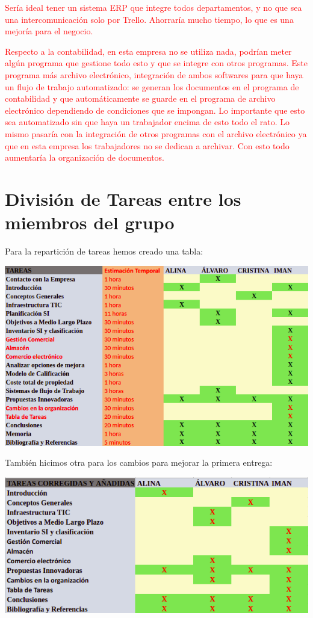 \documentclass{article}
\begin{document}
\textcolor{Red}{Sería ideal tener un sistema ERP que integre todos departamentos, y no que sea una intercomunicación solo por Trello. Ahorraría mucho tiempo, lo que es una mejoría para el negocio.}

\textcolor{Red}{Respecto a la contabilidad, en esta empresa no se utiliza nada, podrían meter algún programa que gestione todo esto y que se integre con otros programas. Este programa más archivo electrónico, integración de ambos softwares para que haya un flujo de trabajo automatizado: se generan los documentos en el programa de contabilidad y que automáticamente se guarde en el programa de archivo electrónico dependiendo de condiciones que se impongan. Lo importante que esto sea automatizado sin que haya un trabajador encima de esto todo el rato. Lo mismo pasaría con la integración de otros programas con el archivo electrónico ya que en esta empresa los trabajadores no se dedican a archivar. Con esto todo aumentaría la organización de documentos.}

\section{División de Tareas entre los miembros del grupo}

Para la repartición de tareas hemos creado una tabla:

\begin{center}
\includegraphics[scale=0.5]{images/tareas.png}
\end{center}

También hicimos otra para los cambios para mejorar la primera entrega:

\begin{center}
\includegraphics[scale=0.5]{images/cambios.png}
\end{center}
\end{document}
